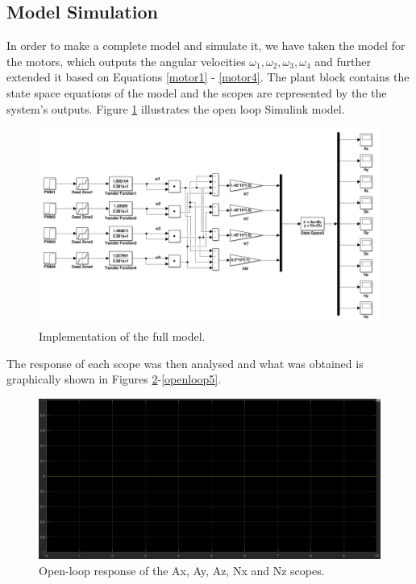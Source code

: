 \subsection{Model Simulation}
In order to make a complete model and simulate it, we have taken the model for the motors, which outputs the angular velocities $\omega_{1}, \omega_{2}, \omega_{3}, \omega_{4}$ and further extended it based on Equations \ref{motor1} - \ref{motor4}. The plant block contains the state space equations of the model and the scopes are represented by the the system's outputs. Figure \ref{openloop} illustrates the open loop Simulink model.

\begin{figure}[H]
  \centering
    \includegraphics[width=1\textwidth]{images/openloop.png}
	\caption{Implementation of the full model.}
	\label{openloop}
\end{figure}

The response of each scope was then analysed and what was obtained is graphically shown in Figures \ref{openloop1}-\ref{openloop5}. 

\begin{figure}[H]
  \centering
    \includegraphics[width=1\textwidth]{images/Ax.png}
	\caption{Open-loop response of the Ax, Ay, Az, Nx and Nz scopes.}
	\label{openloop1}
\end{figure}

